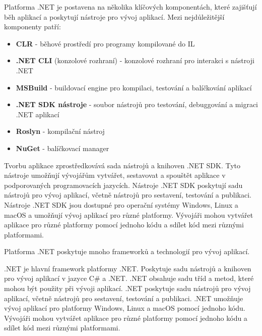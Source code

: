 
Platforma .NET je postavena na několika klíčových komponentách, které zajišťují běh aplikací a poskytují nástroje pro vývoj aplikací. Mezi nejdůležitější komponenty patří:


\begin{itemize}
    \item \textbf{CLR} - běhové prostředí pro programy kompilované do IL
    \item \textbf{.NET CLI} (konzolové rozhraní) - konzolové rozhraní pro interakci s nástroji .NET
    \item \textbf{MSBuild} - buildovací engine pro kompilaci, testování a balíčkování aplikací
    \item \textbf{.NET SDK nástroje} - soubor nástrojů pro testování, debuggování a migraci .NET aplikací
    \item \textbf{Roslyn} - kompilační nástroj
    \item \textbf{NuGet} - balíčkovací manager 
\end{itemize}

Tvorbu aplikace zprostředkovává sada nástrojů a knihoven .NET SDK. Tyto nástroje umožňují vývojářům vytvářet, sestavovat a spouštět aplikace v podporovaných programovacích jazycích. Nástroje .NET SDK poskytují sadu nástrojů pro vývoj aplikací, včetně nástrojů pro sestavení, testování a publikaci. Nástroje .NET SDK jsou dostupné pro operační systémy Windows, Linux a macOS a umožňují vývoj aplikací pro různé platformy. Vývojáři mohou vytvářet aplikace pro různé platformy pomocí jednoho kódu a sdílet kód mezi různými platformami. \cite{Richter2012}


Platforma .NET poskytuje mnoho frameworků a technologií pro vývoj aplikací.



.NET je hlavní framework platformy .NET. Poskytuje sadu nástrojů a knihoven pro vývoj aplikací v jazyce C\# a .NET. .NET obsahuje sadu tříd a metod, které mohou být použity při vývoji aplikací. .NET poskytuje sadu nástrojů pro vývoj aplikací, včetně nástrojů pro sestavení, testování a publikaci. .NET umožňuje vývoj aplikací pro platformy Windows, Linux a macOS pomocí jednoho kódu. Vývojáři mohou vytvářet aplikace pro různé platformy pomocí jednoho kódu a sdílet kód mezi různými platformami.


